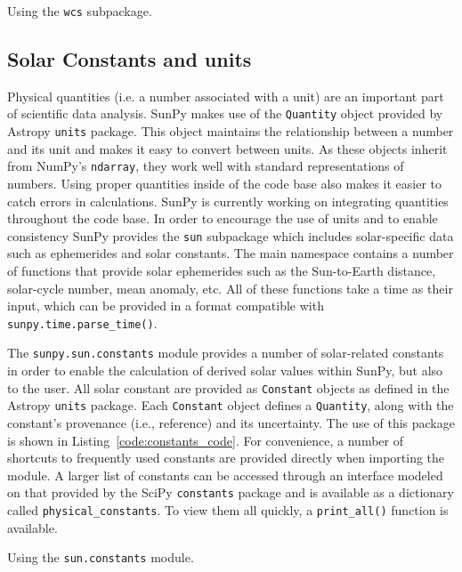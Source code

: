 \begin{listing}[H]
\caption{Using the \texttt{wcs} subpackage.}
\label{code:wcs_code}
\end{listing}

\subsection{Solar Constants and units}\label{ssec:util:sun}
Physical quantities (i.e. a number associated with a unit) are an important part
of scientific data analysis. SunPy makes use of the \texttt{Quantity} object provided by 
Astropy \texttt{units} package. This object maintains the relationship between 
a number and its unit and makes it easy to convert between units. 
As these objects inherit from 
NumPy's \texttt{ndarray}, they work well with standard representations of numbers. Using proper
quantities inside of the code base also makes it easier to catch errors in calculations.
SunPy is currently working on integrating quantities throughout the code base.
In order to encourage the use of units and to enable consistency SunPy provides
the \texttt{sun} subpackage which includes solar-specific data such as ephemerides and
solar constants. The main namespace contains a number of functions that provide solar
ephemerides such as the Sun-to-Earth distance, solar-cycle number, mean 
anomaly, etc.
All of these functions take a time as their input, which can be provided in a format
compatible with \texttt{sunpy.time.parse\_time()}. 

The \texttt{sunpy.sun.constants} module provides a number of solar-related 
constants in order to enable the calculation of derived solar 
values within SunPy, but also to the user. All solar 
constant are provided as \texttt{Constant} objects as defined in the Astropy \texttt{units} package. Each 
\texttt{Constant} object defines a \texttt{Quantity}, along with 
the constant's provenance (i.e., reference) and its uncertainty. The use of this package
is shown in Listing~\ref{code:constants_code}.
For convenience, a number of shortcuts to frequently used constants are provided 
directly when importing the module. A larger list of constants can be 
accessed through an interface modeled on that provided by the SciPy \texttt{constants}
package and is available as a dictionary called \texttt{physical\_constants}. 
To view them all quickly, a \texttt{print\_all()} function is available.

\begin{listing}[H]
\caption{Using the \texttt{sun.constants} module.}
\label{code:constants_code}
\end{listing}
	
